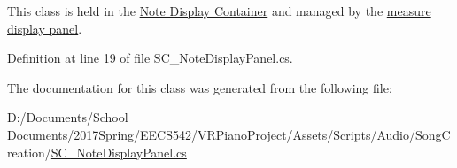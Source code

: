 This class is held in the \hyperlink{group___doc_s_c___n_d_c}{Note Display Container} and managed by the \hyperlink{group___doc_s_c___m_d_p}{measure display panel}. 

Definition at line 19 of file S\+C\+\_\+\+Note\+Display\+Panel.\+cs.



The documentation for this class was generated from the following file\+:\begin{DoxyCompactItemize}
\item 
D\+:/\+Documents/\+School Documents/2017\+Spring/\+E\+E\+C\+S542/\+V\+R\+Piano\+Project/\+Assets/\+Scripts/\+Audio/\+Song\+Creation/\hyperlink{_s_c___note_display_panel_8cs}{S\+C\+\_\+\+Note\+Display\+Panel.\+cs}\end{DoxyCompactItemize}
